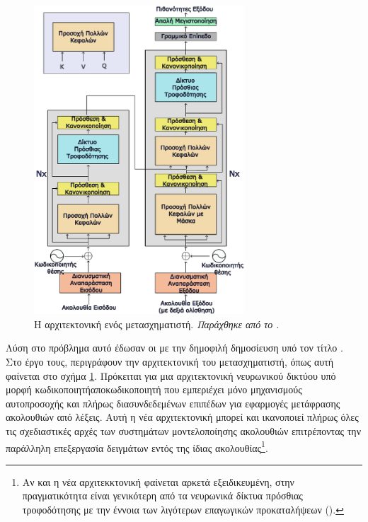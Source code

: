 \begin{figure}[h]
  \centering
  \includegraphics[width=0.7\textwidth]{images/chapter theoritical background/transformer_gr.pdf}
  \caption{Η αρχιτεκτονική ενός μετασχηματιστή\cite{transformers_attention_is_all_you_need}. \textit{Παράχθηκε από το \href{https://inkscape.org/}{}}.}
  \label{fig:transformer}
\end{figure}

Λύση στο πρόβλημα αυτό έδωσαν οι  με την δημοφιλή δημοσίευση υπό τον τίτλο . Στο έργο τους, περιγράφουν την αρχιτεκτονική του μετασχηματιστή, όπως αυτή φαίνεται στο σχήμα \ref{fig:transformer}. Πρόκειται για μια αρχιτεκτονική νευρωνικού δικτύου υπό μορφή κωδικοποιητή\textemdash αποκωδικοποιητή που εμπεριέχει μόνο μηχανισμούς αυτο\textendash προσοχής και πλήρως διασυνδεδεμένων επιπέδων για εφαρμογές μετάφρασης ακολουθιών από λέξεις. Αυτή η νέα αρχιτεκτονική μπορεί και ικανοποιεί πλήρως όλες τις σχεδιαστικές αρχές των συστημάτων μοντελοποίησης ακολουθιών επιτρέποντας την παράλληλη επεξεργασία δειγμάτων εντός της ίδιας ακολουθίας\footnote{Αν και η νέα αρχιτεκκτονική φαίνεται αρκετά εξειδικευμένη, στην πραγματικότητα είναι γενικότερη από τα νευρωνικά δίκτυα πρόσθιας τροφοδότησης με την έννοια των λιγότερων επαγωγικών προκαταλήψεων ().}. \par


